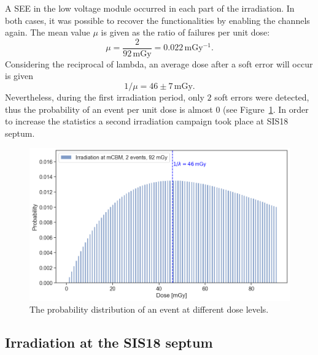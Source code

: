 A \gls{SEE} in the low voltage module occurred in each part of the irradiation. In both cases, it was possible to recover the functionalities by enabling the channels again. The mean value $\mu$ is given as the ratio of failures per unit dose:
\begin{equation}
    \mu = \frac{2}{92\,\mathrm{mGy}} = 0.022\,\mathrm{mGy^{-1}}.
\end{equation}
Considering the reciprocal of lambda,  an average dose after a soft error will occur is given 
\begin{equation}
    1/\mu = 46\pm 7\,\mathrm{mGy}.
\end{equation}
Nevertheless, during the first irradiation period, only $2$ soft errors were detected, thus the probability of an event per unit dose is almost 0 (see Figure~\ref{fig:crate_prob}. In order to increase the statistics a second irradiation campaign took place at SIS18 septum.

\begin{figure}[!h]
    \centering
    \includegraphics[width=0.65\columnwidth]{Chapter4/images/MCBM_crate.png}
    \caption{The probability distribution of an event at different dose levels.}
    \label{fig:crate_prob}
\end{figure}


\subsection{Irradiation at the SIS18 septum}
